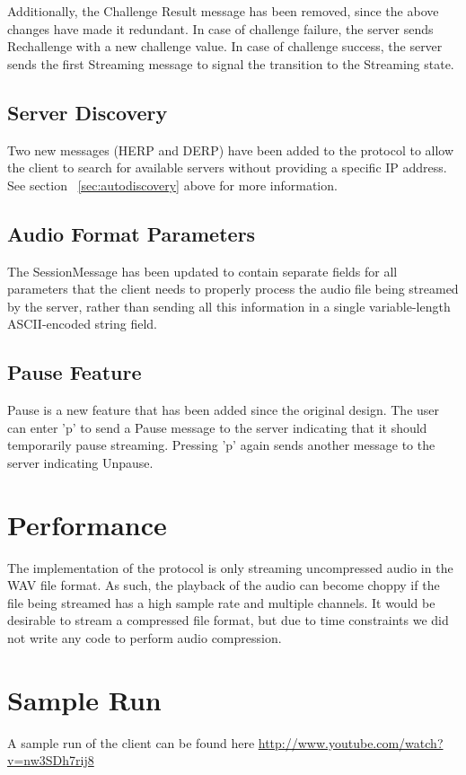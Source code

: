 \documentclass[12pt,letterpaper,titlepage]{article}
\begin{document}
Additionally, the Challenge Result message has been removed, since the above changes have made it redundant.  In case of challenge failure, the server sends Rechallenge with a new challenge value.  In case of challenge success, the server sends the first Streaming message to signal the transition to the Streaming state.

\subsection{Server Discovery}
Two new messages (HERP and DERP) have been added to the protocol to allow the client to search for available servers without providing a specific IP address.  See section ~\ref{sec:autodiscovery} above for more information.

\subsection{Audio Format Parameters}
The SessionMessage has been updated to contain separate fields for all parameters that the client needs to properly process the audio file being streamed by the server, rather than sending all this information in a single variable-length ASCII-encoded string field.

\subsection{Pause Feature}
Pause is a new feature that has been added since the original design.  The user can enter 'p' to send a Pause message to the server indicating that it should temporarily pause streaming.  Pressing 'p' again sends another message to the server indicating Unpause.

\section{Performance}
The implementation of the protocol is only streaming uncompressed audio in the WAV file format.
As such, the playback of the audio can become choppy if the file being streamed has a high
sample rate and multiple channels. It would be desirable to stream a compressed file format, but
due to time constraints we did not write any code to perform audio compression.

\section{Sample Run}
A sample run of the client can be found here \url{http://www.youtube.com/watch?v=nw3SDh7rij8}
\end{document}
